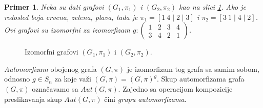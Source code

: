 \documentclass[12pt,oneside]{memoir}
\newtheorem{example}{Primer}
\theoremstyle{definition}
\begin{document}
   \begin{example}
	   Neka su dati grafovi $(G_1, \pi_1)$ i $(G_2, \pi_2)$ kao na slici
	   \ref{img:iso}. Ako je redosled boja crvena, zelena, plava, tada je
	   $\pi_1 = [1\ 4\mid 2 \mid 3]$ i $\pi_2 = [3\ 1 \mid 4 \mid 2]$. Ovi
	   grafovi su izomorfni za izomorfizam
	   $g :
	   \begin{pmatrix}
		   1 & 2 & 3 & 4\\
		   3 & 4 & 2 & 1
	   \end{pmatrix}$.
   \end{example}
   \begin{figure}[htp]
	   \centering
	   \hspace{20pt}
	   \caption{Izomorfni grafovi $(G_1, \pi_1)$ i $(G_2, \pi_2)$.}
	   \label{img:iso}
   \end{figure}

   \emph{Automorfizam} obojenog grafa $(G, \pi)$ je izomorfizam tog grafa sa
   samim sobom, odnosno $g \in S_n$ za koje važi $(G, \pi) = (G, \pi)^g$. Skup
   automorfizama grafa $(G, \pi)$ označavamo sa $Aut(G, \pi)$. Zajedno sa
   operacijom kompozicije preslikavanja skup $Aut(G, \pi)$ čini \emph{grupu
   automorfizama}.
\end{document}

